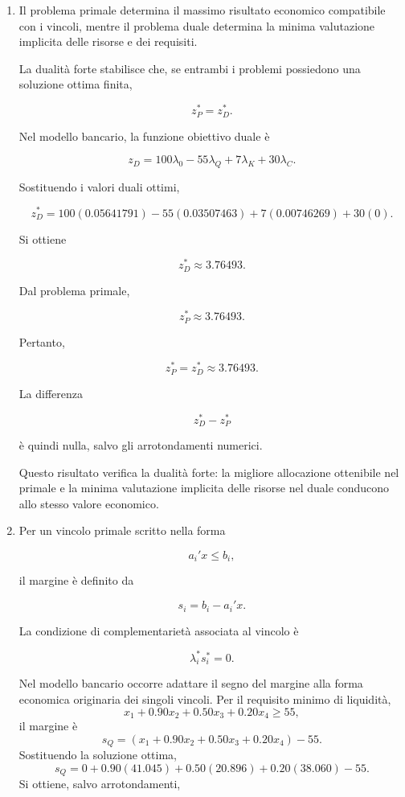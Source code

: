 \begin{enumerate}

\item Il problema primale determina il massimo risultato economico
compatibile con i vincoli, mentre il problema duale determina la minima
valutazione implicita delle risorse e dei requisiti.

La dualit\`a forte stabilisce che, se entrambi i problemi possiedono una
soluzione ottima finita,

\[
z_P^*
=
z_D^*.
\]

Nel modello bancario, la funzione obiettivo duale \`e

\[
z_D
=
100\lambda_0
-
55\lambda_Q
+
7\lambda_K
+
30\lambda_C.
\]

Sostituendo i valori duali ottimi,

\[
z_D^*
=
100(0.05641791)
-
55(0.03507463)
+
7(0.00746269)
+
30(0).
\]

Si ottiene

\[
z_D^*
\approx
3.76493.
\]

Dal problema primale,

\[
z_P^*
\approx
3.76493.
\]

Pertanto,

\[
z_P^*
=
z_D^*
\approx
3.76493.
\]

La differenza

\[
z_D^*-z_P^*
\]

\`e quindi nulla, salvo gli arrotondamenti numerici.

Questo risultato verifica la dualit\`a forte: la migliore allocazione
ottenibile nel primale e la minima valutazione implicita delle risorse nel
duale conducono allo stesso valore economico.

\item Per un vincolo primale scritto nella forma

\[
a_i'x\leq b_i,
\]

il margine \`e definito da

\[
s_i
=
b_i-a_i'x.
\]

La condizione di complementariet\`a associata al vincolo \`e

\[
\lambda_i^*s_i^*
=
0.
\]

Nel modello bancario occorre adattare il segno del margine alla forma
economica originaria dei singoli vincoli.
Per il requisito minimo di liquidit\`a,
\[
x_1+0.90x_2+0.50x_3+0.20x_4
\geq
55,
\]
il margine \`e
\[
s_Q
=
\left(
x_1+0.90x_2+0.50x_3+0.20x_4
\right)
-
55.
\]
Sostituendo la soluzione ottima,
\[
s_Q
=
0
+
0.90(41.045)
+
0.50(20.896)
+
0.20(38.060)
-
55.
\]
Si ottiene, salvo arrotondamenti,


\end{enumerate}
